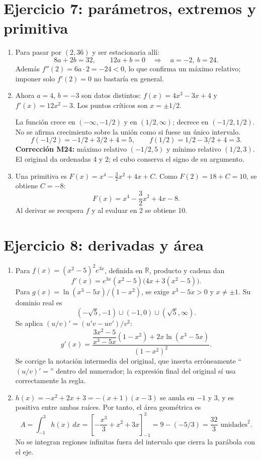 \documentclass[11pt]{article}
\begin{document}
\section*{Ejercicio 7: parámetros, extremos y primitiva}
\begin{enumerate}[label=(\alph*)]
\item Para pasar por $(2,36)$ y ser estacionaria allí:
\[
8a+2b=32,\qquad12a+b=0
\quad\Longrightarrow\quad\boxed{a=-2,\ b=24}.
\]
Además $f''(2)=6a\cdot2=-24<0$, lo que confirma un máximo relativo; imponer solo $f'(2)=0$ no bastaría en general.
\item Ahora $a=4$, $b=-3$ son datos distintos: $f(x)=4x^3-3x+4$ y $f'(x)=12x^2-3$. Los puntos críticos son $x=\pm1/2$.

La función crece en $(-\infty,-1/2)$ y en $(1/2,\infty)$; decrece en $(-1/2,1/2)$. No se afirma crecimiento sobre la unión como si fuese un único intervalo.
\[
f(-1/2)=-1/2+3/2+4=5,\qquad
f(1/2)=1/2-3/2+4=3.
\]
\textbf{Corrección M24:} máximo relativo $\boxed{(-1/2,5)}$ y mínimo relativo $\boxed{(1/2,3)}$. El original da ordenadas 4 y 2; el cubo conserva el signo de su argumento.
\item Una primitiva es $F(x)=x^4-\frac32x^2+4x+C$. Como $F(2)=18+C=10$, se obtiene $C=-8$:
\[
\boxed{F(x)=x^4-\frac32x^2+4x-8}.
\]
Al derivar se recupera $f$ y al evaluar en 2 se obtiene 10.
\end{enumerate}
\clearpage
\section*{Ejercicio 8: derivadas y área}
\begin{enumerate}[label=(\alph*)]
\item Para $f(x)=(x^2-5)^2e^{3x}$, definida en $\mathbb R$, producto y cadena dan
\[
\boxed{f'(x)=e^{3x}(x^2-5)\bigl(4x+3(x^2-5)\bigr)}.
\]
Para $g(x)=\ln(x^3-5x)/(1-x^2)$, se exige $x^3-5x>0$ y $x\ne\pm1$. Su dominio real es
\[
(-\sqrt5,-1)\cup(-1,0)\cup(\sqrt5,\infty).
\]
Se aplica $(u/v)'=(u'v-uv')/v^2$:
\[
\boxed{g'(x)=\frac{\dfrac{3x^2-5}{x^3-5x}(1-x^2)+2x\ln(x^3-5x)}{(1-x^2)^2}}.
\]
Se corrige la notación intermedia del original, que inserta erróneamente ``$(u/v)'=$'' dentro del numerador; la expresión final del original sí usa correctamente la regla.
\item $h(x)=-x^2+2x+3=-(x+1)(x-3)$ se anula en $-1$ y $3$, y es positiva entre ambas raíces. Por tanto, el área geométrica es
\[
A=\int_{-1}^{3}h(x)\,dx
=\left[-\frac{x^3}{3}+x^2+3x\right]_{-1}^{3}
=9-(-5/3)=\boxed{\frac{32}{3}\text{ unidades}^2}.
\]
No se integran regiones infinitas fuera del intervalo que cierra la parábola con el eje.
\end{enumerate}
\clearpage
\end{document}
